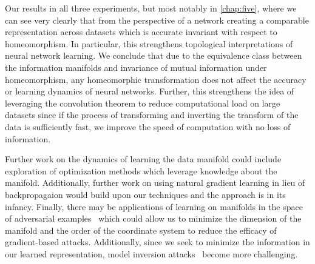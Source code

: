 Our results in all three experiments, but most notably in \ref{chap:five}, where we can see very clearly that from the perspective of a network creating a comparable representation across datasets which is accurate invariant with respect to homeomorphism.
In particular, this strengthens topological interpretations of neural network learning.
We conclude that due to the equivalence class between the information manifolds and invariance of mutual information under homeomorphism, any homeomorphic transformation does not affect the accuracy or learning dynamics of neural networks.
Further, this strengthens the idea of leveraging the convolution theorem to reduce computational load on large datasets since if the process of transforming and inverting the transform of the data is sufficiently fast, we improve the speed of computation with no loss of information.

Further work on the dynamics of learning the data manifold could include exploration of optimization methods which leverage knowledge about the manifold.
Additionally, further work on using natural gradient learning in lieu of backpropagaion would build upon our techniques and the approach is in its infancy.
Finally, there may be applications of learning on manifolds in the space of adversarial examples~\cite{szegedy2013intriguing} which could allow us to minimize the dimension of the manifold and the order of the coordinate system to reduce the efficacy of gradient-based attacks.
Additionally, since we seek to minimize the information in our learned representation, model inversion attacks~\cite{zhang2019secret} become more challenging.